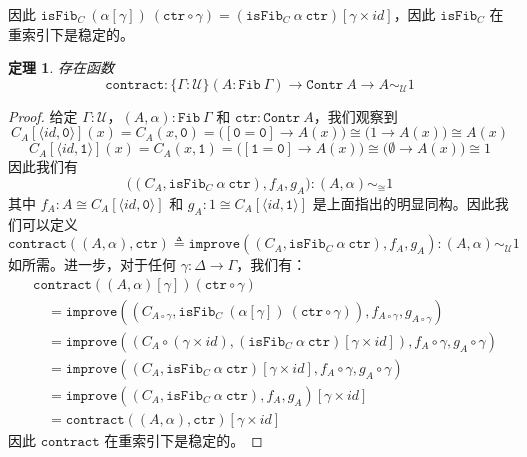 \documentclass{ctexrep}
\theoremstyle{plain}
\newtheorem{theorem}{定理}[section]
\theoremstyle{definition}
\theoremstyle{remark}
\begin{document}
因此 $\mathtt{isFib}_C\ (\alpha[\gamma])\ (\mathtt{ctr} \circ \gamma) = (\mathtt{isFib}_C\ \alpha\ \mathtt{ctr})[\gamma \times  id ]$，因此 $\mathtt{isFib}_C$ 在重索引下是稳定的。

\begin{theorem}
存在函数
$$\mathtt{contract} : \{\Gamma : \mathcal{U}\}(A : \mathtt{Fib}\ \Gamma) \to \mathtt{Contr}\ A \to A \sim_{\mathcal{U}} 1$$
\end{theorem}

\begin{proof}
给定 $\Gamma : \mathcal{U}$，$(A,\alpha) : \mathtt{Fib}\ \Gamma$ 和 $\mathtt{ctr} : \mathtt{Contr}\ A$，我们观察到
$$C_A[\langle  id , \mathtt{0} \rangle](x) = C_A(x,\mathtt{0}) = \big([\mathtt{0}=\mathtt{0}] \to A(x)\big) \cong \big(1 \to A(x)\big) \cong A(x)$$
$$C_A[\langle  id , \mathtt{1} \rangle](x) = C_A(x,\mathtt{1}) = \big([\mathtt{1}=\mathtt{0}] \to A(x)\big) \cong \big(\emptyset \to A(x)\big) \cong 1$$
因此我们有
$$\big((C_A, \mathtt{isFib}_C\ \alpha\ \mathtt{ctr}), f_A, g_A\big) : (A,\alpha) \sim_{\cong} 1$$
其中 $f_A : A \cong C_A[\langle  id , \mathtt{0} \rangle]$ 和 $g_A : 1 \cong C_A[\langle  id , \mathtt{1} \rangle]$ 是上面指出的明显同构。因此我们可以定义
$$\mathtt{contract}((A,\alpha), \mathtt{ctr}) \triangleq \mathtt{improve}((C_A, \mathtt{isFib}_C\ \alpha\ \mathtt{ctr}), f_A, g_A) : (A,\alpha) \sim_{\mathcal{U}} 1$$
如所需。进一步，对于任何 $\gamma : \Delta \to \Gamma$，我们有：
\begin{align*}
&\mathtt{contract}((A,\alpha)[\gamma])(\mathtt{ctr} \circ \gamma) \\
&\quad = \mathtt{improve}((C_{A \circ \gamma}, \mathtt{isFib}_C\ (\alpha[\gamma])\ (\mathtt{ctr} \circ \gamma)), f_{A \circ \gamma}, g_{A \circ \gamma}) \\
&\quad = \mathtt{improve}((C_A \circ (\gamma \times  id ), (\mathtt{isFib}_C\ \alpha\ \mathtt{ctr})[\gamma \times  id ]), f_A \circ \gamma, g_A \circ \gamma) \\
&\quad = \mathtt{improve}((C_A, \mathtt{isFib}_C\ \alpha\ \mathtt{ctr})[\gamma \times  id ], f_A \circ \gamma, g_A \circ \gamma) \\
&\quad = \mathtt{improve}((C_A, \mathtt{isFib}_C\ \alpha\ \mathtt{ctr}), f_A, g_A)[\gamma \times  id ] \\
&\quad = \mathtt{contract}((A,\alpha), \mathtt{ctr})[\gamma \times  id ]
\end{align*}
因此 $\mathtt{contract}$ 在重索引下是稳定的。
\end{proof}
\end{document}
